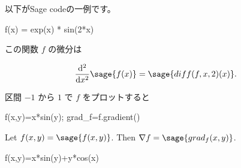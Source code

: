 以下がSage codeの一例です。

\begin{sageblock}
    f(x) = exp(x) * sin(2*x)
\end{sageblock}

この関数 $f$ の微分は

\[
\frac{\mathrm{d}^{2}}{\mathrm{d}x^{2}} \sage{f(x)} =
\sage{diff(f, x, 2)(x)}.
\]

区間 $-1$ から $1$ で $f$ をプロットすると

\begin{sagesilent}
f(x,y)=x*sin(y); grad_f=f.gradient()
\end{sagesilent}
Let $f(x,y)=\sage{f(x,y)}$. Then $\nabla f=\sage{grad_f(x,y)}$.

\begin{sagesilent}
f(x,y)=x*sin(y)+y*cos(x)
\end{sagesilent}





\ifdefined\MainDoc
    \ifdefined\Preamble
        
    \else
    \fi
\else
\fi
